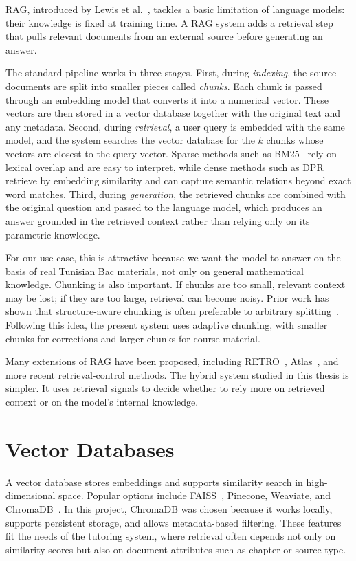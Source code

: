 RAG, introduced by Lewis et al.~\cite{lewis2020rag}, tackles a basic
limitation of language models: their knowledge is fixed at training time. A
RAG system adds a retrieval step that pulls relevant documents from an
external source before generating an answer.

The standard pipeline works in three stages. First, during
\textit{indexing}, the source documents are split into smaller pieces called
\textit{chunks}. Each chunk is passed through an embedding model that
converts it into a numerical vector. These vectors are then stored in a
vector database together with the original text and any metadata. Second,
during \textit{retrieval}, a user query is embedded with the same model, and
the system searches the vector database for the $k$ chunks whose vectors are
closest to the query vector. Sparse methods such as
BM25~\cite{robertson2009bm25} rely on lexical overlap and are easy to
interpret, while dense methods such as
DPR~\cite{karpukhin2020dpr} retrieve by embedding similarity and can capture
semantic relations beyond exact word matches. Third, during
\textit{generation}, the retrieved chunks are combined with the original
question and passed to the language model, which produces an answer grounded
in the retrieved context rather than relying only on its parametric
knowledge.

For our use case, this is attractive because we want the model to answer on
the basis of real Tunisian Bac materials, not only on general mathematical
knowledge. Chunking is also important. If chunks are too small, relevant
context may be lost; if they are too large, retrieval can become noisy.
Prior work has shown that structure-aware chunking is often preferable to
arbitrary splitting~\cite{zhao2024financial_chunking,chen2024mog}. Following
this idea, the present system uses adaptive chunking, with smaller chunks
for corrections and larger chunks for course material.

Many extensions of RAG have been proposed, including
RETRO~\cite{borgeaud2022retro}, Atlas~\cite{izacard2022atlas}, and more
recent retrieval-control methods. The hybrid system studied in this thesis
is simpler. It uses retrieval signals to decide whether to rely more on
retrieved context or on the model's internal knowledge.
\section{Vector Databases}
\label{sec:vector-db-background}

A vector database stores embeddings and supports similarity search in
high-dimensional space. Popular options include
FAISS~\cite{johnson2019faiss}, Pinecone, Weaviate, and
ChromaDB~\cite{chromadb2024}. In this project, ChromaDB was chosen because
it works locally, supports persistent storage, and allows metadata-based
filtering. These features fit the needs of the tutoring system, where
retrieval often depends not only on similarity scores but also on document
attributes such as chapter or source type.

